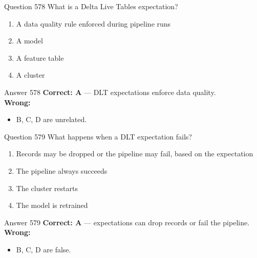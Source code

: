 \documentclass[aspectratio=169,11pt]{beamer}
\begin{document}
	\begin{frame}{Question 578}
		What is a Delta Live Tables expectation?
		\begin{enumerate}[label=\Alph*.]
			\item A data quality rule enforced during pipeline runs
			\item A model
			\item A feature table
			\item A cluster
		\end{enumerate}
	\end{frame}
	\begin{frame}{Answer 578}
		\textbf{Correct: A} --- DLT expectations enforce data quality.\\
		\vspace{0.5em}
		\textbf{Wrong:}
		\begin{itemize}
			\item B, C, D are unrelated.
		\end{itemize}
	\end{frame}
	
	\begin{frame}{Question 579}
		What happens when a DLT expectation fails?
		\begin{enumerate}[label=\Alph*.]
			\item Records may be dropped or the pipeline may fail, based on the expectation
			\item The pipeline always succeeds
			\item The cluster restarts
			\item The model is retrained
		\end{enumerate}
	\end{frame}
	\begin{frame}{Answer 579}
		\textbf{Correct: A} --- expectations can drop records or fail the pipeline.\\
		\vspace{0.5em}
		\textbf{Wrong:}
		\begin{itemize}
			\item B, C, D are false.
		\end{itemize}
	\end{frame}
	
\end{document}
